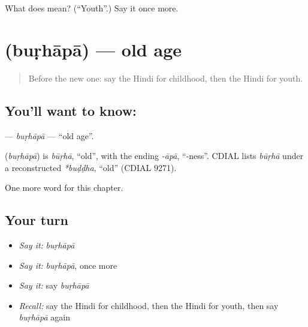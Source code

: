 \begin{tcolorbox}[breakable,colback=teal!4,colframe=teal!35!black,title={Before you move on}]
What does  mean? (\textquotedblleft{}Youth\textquotedblright{}.) Say it once more.
\end{tcolorbox}
\section[\texorpdfstring{\hi{बुढ़ापा} (buṛhāpā)}{बुढ़ापा (buṛhāpā)}]{ (buṛhāpā) — old age}

\label{lesson:HI-C220-burhapa}



\begin{quote}
Before the new one: say the Hindi for childhood, then the Hindi for youth.
\end{quote}

\subsection*{You'll want to know: }
\textbf{} — \emph{buṛhāpā} — \textquotedblleft{}old age\textquotedblright{}.

\begin{cousinweb}
\textbf{} (\emph{buṛhāpā}) is \emph{būṛhā}, \textquotedblleft{}old\textquotedblright{}, with the ending \emph{-āpā}, \textquotedblleft{}-ness\textquotedblright{}. CDIAL lists \emph{būṛhā} under a reconstructed \emph{*buḍḍha}, \textquotedblleft{}old\textquotedblright{} (CDIAL 9271).
\end{cousinweb}

\begin{grammarlens}[title={What you've built}]
One more word for this chapter.
\end{grammarlens}

\subsection*{Your turn}
\begin{itemize}
\raggedright
  \item \emph{Say it:} \emph{buṛhāpā}
  \item \emph{Say it:} \emph{buṛhāpā}, once more
  \item \emph{Say it:} say \emph{buṛhāpā}
  \item \emph{Recall:} say the Hindi for childhood, then the Hindi for youth, then say \emph{buṛhāpā} again
\end{itemize}

